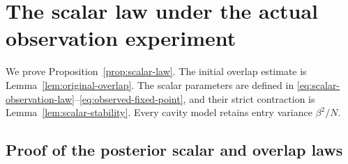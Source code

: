 \documentclass[11pt,reqno]{amsart}
\begin{document}
\section{The scalar law under the actual observation experiment}\label{sec:scalar-law}

We prove Proposition~\ref{prop:scalar-law}. The initial overlap estimate is Lemma~\ref{lem:original-overlap}. The scalar parameters are defined in \eqref{eq:scalar-observation-law}--\eqref{eq:observed-fixed-point}, and their strict contraction is Lemma~\ref{lem:scalar-stability}. Every cavity model retains entry variance $\beta^2/N$.

\subsection{Proof of the posterior scalar and overlap laws}
\end{document}
